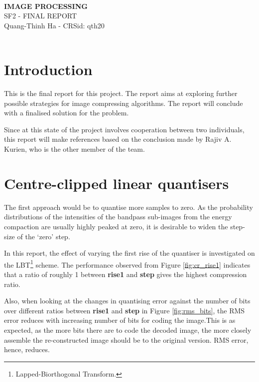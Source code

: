 \documentclass[a4paper, 11pt]{article}
\begin{document}
\Large
\begin{center}
\hrulefill \\
\textbf{IMAGE PROCESSING} \\
SF2 - FINAL REPORT \\
\vspace{0.2cm}
\normalsize 
Quang-Thinh Ha - CRSid: qth20 \\
\hrulefill \\
\end{center}

\normalsize

\section{Introduction}
This is the final report for this project. The report aims at exploring further possible strategies for image compressing algorithms. The report will conclude with a finalised solution for the problem. 

Since at this state of the project involves cooperation between two individuals, this report will make references based on the conclusion made by Rajiv A. Kurien, who is the other member of the team.

\section{Centre-clipped linear quantisers}
The first approach would be to quantise more samples to zero. As the probability distributions of the intensities of the bandpass sub-images from the energy compaction are usually highly peaked at zero, it is desirable to widen the step-size of the `zero' step. 

In this report, the effect of varying the first rise of the quantiser is investigated on the LBT\footnote{Lapped-Biorthogonal Transform.} scheme. The performance observed from Figure \ref{fig:cr_rise1} indicates that a ratio of roughly 1 between \textbf{rise1} and \textbf{step} gives the highest compression ratio. 

Also, when looking at the changes in quantising error against the number of bits over different ratios between \textbf{rise1} and \textbf{step} in Figure \ref{fig:rms_bits}, the RMS error reduces with increasing number of bits for coding the image.This is as expected, as the more bits there are to code the decoded image, the more closely assemble the re-constructed image should be to the original version. RMS error, hence, reduces. 
\end{document}
